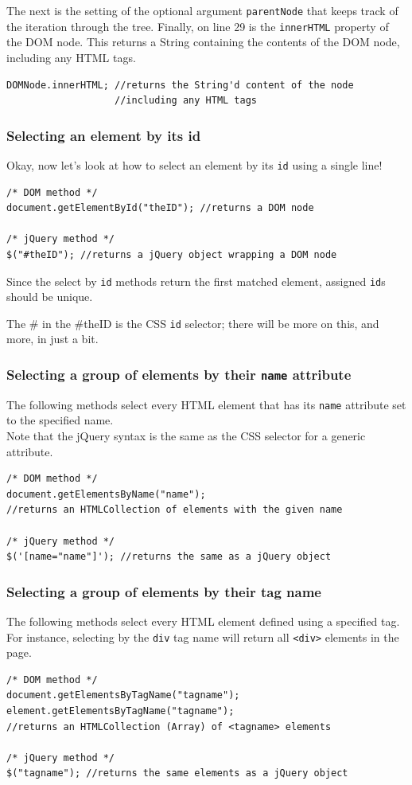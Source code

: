 \documentclass[12pt]{article}
\begin{document}
The next is the setting of the optional argument \texttt{parentNode} that keeps track of the iteration through the tree. Finally, on line 29 is the \texttt{innerHTML} property of the DOM node. This returns a String containing the contents of the DOM node, including any HTML tags.
\begin{Verbatim}[frame=single]
DOMNode.innerHTML; //returns the String'd content of the node
                   //including any HTML tags
\end{Verbatim}


\subsubsection*{Selecting an element by its id}
Okay, now let's look at how to select an element by its \texttt{id} using a single line!
\begin{Verbatim}[frame=single]
/* DOM method */
document.getElementById("theID"); //returns a DOM node

/* jQuery method */
$("#theID"); //returns a jQuery object wrapping a DOM node
\end{Verbatim}
Since the select by \texttt{id} methods return the first matched element, assigned \texttt{id}s should be unique.
\par
The \# in the \textquotedbl\#theID\textquotedbl{} is the CSS \texttt{id} selector; there will be more on this, and more, in just a bit.

\subsubsection*{Selecting a group of elements by their \texttt{name} attribute}
The following methods select every HTML element that has its \texttt{name} attribute set to the specified name.
\\
Note that the jQuery syntax is the same as the CSS selector for a generic attribute.
\begin{Verbatim}[frame=single]
/* DOM method */
document.getElementsByName("name");
//returns an HTMLCollection of elements with the given name

/* jQuery method */
$('[name="name"]'); //returns the same as a jQuery object
\end{Verbatim}

\subsubsection*{Selecting a group of elements by their tag name}
The following methods select every HTML element defined using a specified tag. For instance, selecting by the \texttt{div} tag name will return all \texttt{<div>} elements in the page.
\begin{Verbatim}[frame=single]
/* DOM method */
document.getElementsByTagName("tagname");
element.getElementsByTagName("tagname");
//returns an HTMLCollection (Array) of <tagname> elements

/* jQuery method */
$("tagname"); //returns the same elements as a jQuery object
\end{Verbatim}
\end{document}
